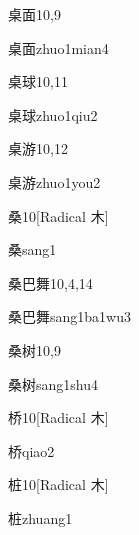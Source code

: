 \begin{entry}{桌面}{10,9}
  \begin{phonetics}{桌面}{zhuo1mian4}
  \end{phonetics}
\end{entry}

\begin{entry}{桌球}{10,11}
  \begin{phonetics}{桌球}{zhuo1qiu2}
  \end{phonetics}
\end{entry}

\begin{entry}{桌游}{10,12}
  \begin{phonetics}{桌游}{zhuo1you2}
  \end{phonetics}
\end{entry}

\begin{entry}{桑}{10}[Radical 木]
  \begin{phonetics}{桑}{sang1}
  \end{phonetics}
\end{entry}

\begin{entry}{桑巴舞}{10,4,14}
  \begin{phonetics}{桑巴舞}{sang1ba1wu3}
  \end{phonetics}
\end{entry}

\begin{entry}{桑树}{10,9}
  \begin{phonetics}{桑树}{sang1shu4}
  \end{phonetics}
\end{entry}

\begin{entry}{桥}{10}[Radical 木]
  \begin{phonetics}{桥}{qiao2}
  \end{phonetics}
\end{entry}

\begin{entry}{桩}{10}[Radical 木]
  \begin{phonetics}{桩}{zhuang1}
  \end{phonetics}
\end{entry}

